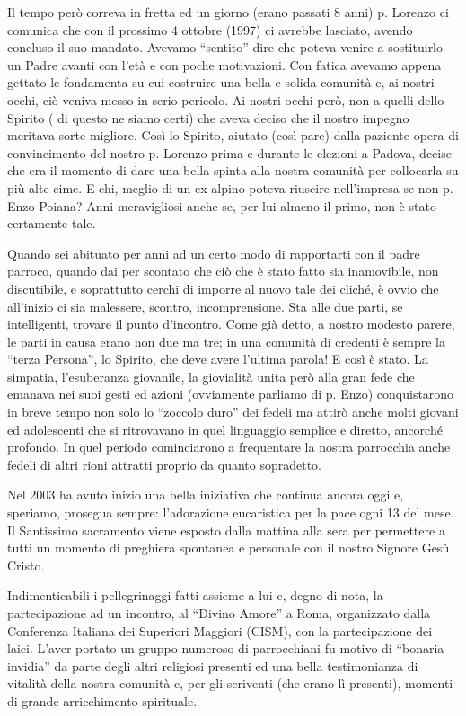 Il tempo però correva in fretta ed un giorno (erano passati 8 anni) p. Lorenzo ci comunica 
che con il prossimo 4 ottobre (1997) ci avrebbe lasciato, avendo concluso il suo mandato.
Avevamo “sentito” dire che poteva venire a sostituirlo un Padre avanti con l’età e con poche 
motivazioni. Con fatica avevamo appena gettato le fondamenta su cui costruire una bella e solida 
comunità e, ai nostri occhi, ciò veniva messo in serio pericolo. Ai nostri occhi però, non a quelli 
dello Spirito ( di questo ne siamo certi) che aveva deciso che il nostro impegno meritava sorte 
migliore. Così lo Spirito, aiutato (così pare) dalla paziente opera di convincimento del nostro p. 
Lorenzo prima e durante le elezioni a Padova, decise che era il momento di dare una bella spinta 
alla nostra comunità per collocarla su più alte cime. E chi, meglio di un ex alpino poteva riuscire 
nell’impresa se non p. Enzo Poiana? Anni meravigliosi anche se, per lui almeno il primo, non è 
stato certamente tale.

Quando sei abituato per anni ad un certo modo di rapportarti con il padre parroco, quando dai per 
scontato che ciò che è stato fatto sia inamovibile, non discutibile, e soprattutto cerchi di imporre al 
nuovo tale dei cliché, è ovvio che all’inizio ci sia malessere, scontro, incomprensione. Sta alle due 
parti, se intelligenti, trovare il punto d’incontro. Come già detto, a nostro modesto parere, le parti in 
causa erano non due ma tre; in una comunità di credenti è sempre la “terza Persona”, lo Spirito, che 
deve avere l’ultima parola! E così è stato.
La simpatia, l’esuberanza giovanile, la giovialità unita però alla gran fede che emanava nei suoi 
gesti ed azioni (ovviamente parliamo di p. Enzo) conquistarono in breve tempo non solo lo “zoccolo 
duro” dei fedeli ma attirò anche molti giovani ed adolescenti che si ritrovavano in quel linguaggio 
semplice e diretto, ancorché profondo. In quel periodo cominciarono a frequentare la nostra 
parrocchia anche fedeli di altri rioni attratti proprio da quanto sopradetto.

Nel 2003 ha avuto inizio una bella iniziativa che continua ancora oggi e, speriamo, prosegua 
sempre: l’adorazione eucaristica per la pace ogni 13 del mese. Il Santissimo sacramento viene 
esposto dalla mattina alla sera per permettere a tutti un momento di preghiera spontanea e personale 
con il nostro Signore Gesù Cristo.  

Indimenticabili i pellegrinaggi fatti assieme a lui e, degno di nota, la partecipazione ad un incontro, 
al “Divino Amore” a Roma, organizzato dalla Conferenza Italiana dei Superiori Maggiori (CISM), 
con la partecipazione dei laici. L’aver portato un gruppo numeroso di parrocchiani fu motivo di 
“bonaria invidia” da parte degli altri religiosi presenti ed una bella testimonianza di vitalità della 
nostra comunità e, per gli scriventi (che erano lì presenti), momenti di grande arricchimento 
spirituale.


